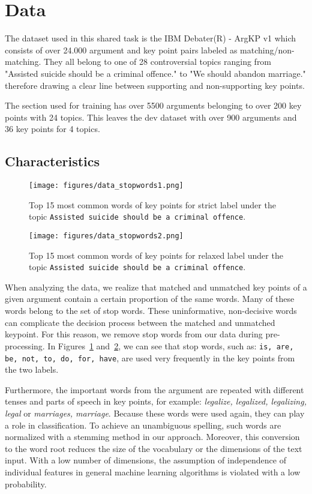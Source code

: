 \section{Data}\label{data}

The dataset used in this shared task is the IBM Debater(R) - ArgKP v1 \cite{Bar-HaimEFKLS2020} which consists of over 
24.000 argument and key point pairs labeled as matching/non-matching.
They all belong to one of 28 controversial topics ranging from "Assisted suicide should be a criminal offence." to 
"We should abandon marriage." therefore drawing a clear line between supporting and non-supporting key points.

The section used for training has over 5500 arguments belonging to over 200 key points with 24 topics. This leaves the 
dev dataset with over 900 arguments and 36 key points for 4 topics.

\subsection{Characteristics}
\begin{figure}
	\caption{Top 15 most common words of key points for strict label under the topic \texttt{Assisted suicide should be a criminal offence}.}
	\label{fig:stopwords-strict}
	\texttt{[image: figures/data\_stopwords1.png]}
\end{figure}
\begin{figure}
	\caption{Top 15 most common words of key points for relaxed label under the topic \texttt{Assisted suicide should be a criminal offence}.}
	\label{fig:stopwords-relaxed}
	\texttt{[image: figures/data\_stopwords2.png]}
\end{figure}

When analyzing the data, we realize that matched and unmatched key points of a given argument contain a certain proportion of the same words. 
Many of these words belong to the set of stop words. 
These uninformative, non-decisive words can complicate the decision process between the matched and unmatched keypoint. 
For this reason, we remove stop words from our data during pre-processing. 
In Figures~\ref{fig:stopwords-strict} and~\ref{fig:stopwords-relaxed}, we can see that stop words, such as: \texttt{is, are, be, not, to, do, for, have}, are used very frequently in the key points from the two labels. 

Furthermore, the important words from the argument are repeated with different tenses and parts of speech in key points, for example: \textit{legalize, legalized, legalizing, legal} or \textit{marriages, marriage}.
Because these words were used again, they can play a role in classification. 
To achieve an unambiguous spelling, such words are normalized with a stemming method in our approach. 
Moreover, this conversion to the word root reduces the size of the vocabulary or the dimensions of the text input. 
With a low number of dimensions, the assumption of independence of individual features in general machine learning algorithms is violated with a low probability. 

